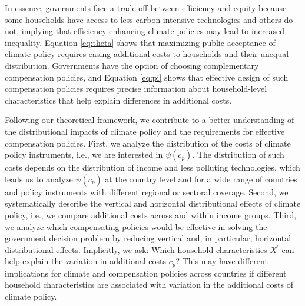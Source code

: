 \documentclass[12pt, a4paper]{article}
\begin{document}
In essence, governments face a trade-off between efficiency and equity \autocite{Hansel.2022,TerryDinan.2016} because some households have access to less carbon-intensive technologies and others do not, implying that efficiency-enhancing climate policies may lead to increased inequality. Equation \ref{eq:theta} shows that maximizing public acceptance of climate policy requires easing additional costs to households and their unequal distribution. Governments have the option of choosing complementary compensation policies, and Equation \ref{eq:pi} shows that effective design of such compensation policies requires precise information about household-level characteristics that help explain differences in additional costs. 

Following our theoretical framework, we contribute to a better understanding of the distributional impacts of climate policy and the requirements for effective compensation policies. First, we analyze the distribution of the costs of climate policy instruments, i.e., we are interested in $\psi(c_{p})$. The distribution of such costs depends on the distribution of income and less polluting technologies, which leads us to analyze $\psi(c_{p})$ at the country level and for a wide range of countries and policy instruments with different regional or sectoral coverage. Second, we systematically describe the vertical and horizontal distributional effects of climate policy, i.e., we compare additional costs across and within income groups. Third, we analyze which compensating policies would be effective in solving the government decision problem by reducing vertical and, in particular, horizontal distributional effects. Implicitly, we ask: Which household characteristics $X^{\prime}$ can help explain the variation in additional costs $c_{p}$? This may have different implications for climate and compensation policies across countries if different household characteristics are associated with variation in the additional costs of climate policy.    

\end{document}
